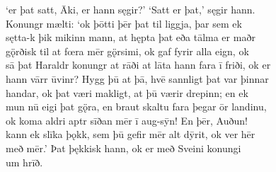 \documentclass[12pt,letterpaper]{book}
\begin{document}
\begin{linenumbers}
`er þat satt, Āki, er hann sęgir?'  `Satt er þat,' sęgir hann.\\
Konungr mælti: `ok þōtti þēr þat til liggja, þar sem ek\\
sętta-k þik mikinn mann, at hępta þat eða tālma er maðr\\
gǫ̈rðisk til at fœra mēr gǫ̈rsimi, ok gaf fyrir alla eign, ok\\
sā þat Haraldr konungr at rāði at lāta hann fara ī friði, ok er\\
hann vārr ūvinr?  Hygg þū at þā, hvē sannligt þat var þinnar\\
handar, ok þat væri makligt, at þū værir drepinn; en ek\\
mun nū eigi þat gǫ̈ra, en braut skaltu fara þegar ōr landinu,\\
ok koma aldri aptr sīðan mēr ī aug-sȳn!  En þēr, Auðun!\\
kann ek slīka þǫkk, sem þū gefir mēr alt dȳrit, ok ver hēr\\
með mēr.'  Þat þękkisk hann, ok er með Sveini konungi\\
um hrīð.


\end{linenumbers}
\end{document}

